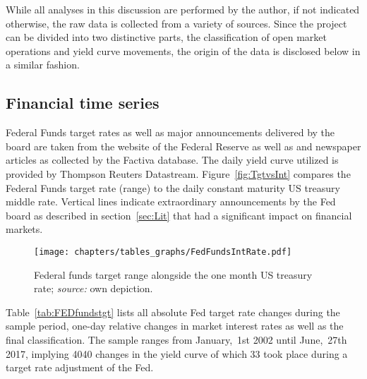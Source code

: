 
While all analyses in this discussion are performed by the author, if not indicated otherwise, the raw data is collected from a variety of sources. Since the project can be divided into two distinctive parts, the classification of open market operations and yield curve movements, the origin of the data is disclosed below in a similar fashion.

\subsection{Financial time series}
Federal Funds target rates as well as major announcements delivered by the board are taken from the website of the Federal Reserve \parencite{Fed.OMOs} as well as \textcite{Fawley.2013} and newspaper articles as collected by the Factiva database. The daily yield curve utilized is provided by Thompson Reuters Datastream. Figure~\vref{fig:TgtvsInt} compares the Federal Funds target rate (range) to the daily constant maturity US treasury middle rate. Vertical lines indicate extraordinary announcements by the Fed board as described in section~\ref{sec:Lit} that had a significant impact on financial markets.
\begin{figure}[htbp]
	\centering
		\texttt{[image: chapters/tables\_graphs/FedFundsIntRate.pdf]} 
	\caption[Federal funds target range alongside the one month US treasury rate.]{Federal funds target range alongside the one month US treasury rate; \textit{source:} own depiction.}
\label{fig:TgtvsInt}
\end{figure}
%

Table~\vref{tab:FEDfundstgt} lists all absolute Fed target rate changes during the sample period, one-day relative changes in market interest rates as well as the final classification. The sample ranges from January,~1st 2002 until June,~27th 2017, implying 4040 changes in the yield curve of which 33 took place during a target rate adjustment of the Fed. 
%

%

